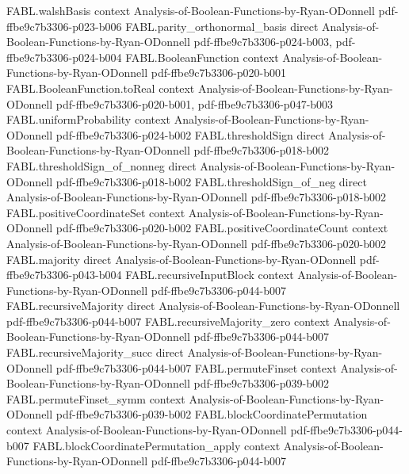 \begin{theorem}
  {FABL.walshBasis}
  {context}
  {Analysis-of-Boolean-Functions-by-Ryan-ODonnell}
  {pdf-ffbe9c7b3306-p023-b006}
\proofstep
  {FABL.parity_orthonormal_basis}
  {direct}
  {Analysis-of-Boolean-Functions-by-Ryan-ODonnell}
  {pdf-ffbe9c7b3306-p024-b003,
    pdf-ffbe9c7b3306-p024-b004}
\proofstep
  {FABL.BooleanFunction}
  {context}
  {Analysis-of-Boolean-Functions-by-Ryan-ODonnell}
  {pdf-ffbe9c7b3306-p020-b001}
\proofstep
  {FABL.BooleanFunction.toReal}
  {context}
  {Analysis-of-Boolean-Functions-by-Ryan-ODonnell}
  {pdf-ffbe9c7b3306-p020-b001,
    pdf-ffbe9c7b3306-p047-b003}
\proofstep
  {FABL.uniformProbability}
  {context}
  {Analysis-of-Boolean-Functions-by-Ryan-ODonnell}
  {pdf-ffbe9c7b3306-p024-b002}
\proofstep
  {FABL.thresholdSign}
  {direct}
  {Analysis-of-Boolean-Functions-by-Ryan-ODonnell}
  {pdf-ffbe9c7b3306-p018-b002}
\proofstep
  {FABL.thresholdSign_of_nonneg}
  {direct}
  {Analysis-of-Boolean-Functions-by-Ryan-ODonnell}
  {pdf-ffbe9c7b3306-p018-b002}
\proofstep
  {FABL.thresholdSign_of_neg}
  {direct}
  {Analysis-of-Boolean-Functions-by-Ryan-ODonnell}
  {pdf-ffbe9c7b3306-p018-b002}
\proofstep
  {FABL.positiveCoordinateSet}
  {context}
  {Analysis-of-Boolean-Functions-by-Ryan-ODonnell}
  {pdf-ffbe9c7b3306-p020-b002}
\proofstep
  {FABL.positiveCoordinateCount}
  {context}
  {Analysis-of-Boolean-Functions-by-Ryan-ODonnell}
  {pdf-ffbe9c7b3306-p020-b002}
\proofstep
  {FABL.majority}
  {direct}
  {Analysis-of-Boolean-Functions-by-Ryan-ODonnell}
  {pdf-ffbe9c7b3306-p043-b004}
\proofstep
  {FABL.recursiveInputBlock}
  {context}
  {Analysis-of-Boolean-Functions-by-Ryan-ODonnell}
  {pdf-ffbe9c7b3306-p044-b007}
\proofstep
  {FABL.recursiveMajority}
  {direct}
  {Analysis-of-Boolean-Functions-by-Ryan-ODonnell}
  {pdf-ffbe9c7b3306-p044-b007}
\proofstep
  {FABL.recursiveMajority_zero}
  {context}
  {Analysis-of-Boolean-Functions-by-Ryan-ODonnell}
  {pdf-ffbe9c7b3306-p044-b007}
\proofstep
  {FABL.recursiveMajority_succ}
  {direct}
  {Analysis-of-Boolean-Functions-by-Ryan-ODonnell}
  {pdf-ffbe9c7b3306-p044-b007}
\proofstep
  {FABL.permuteFinset}
  {context}
  {Analysis-of-Boolean-Functions-by-Ryan-ODonnell}
  {pdf-ffbe9c7b3306-p039-b002}
\proofstep
  {FABL.permuteFinset_symm}
  {context}
  {Analysis-of-Boolean-Functions-by-Ryan-ODonnell}
  {pdf-ffbe9c7b3306-p039-b002}
\proofstep
  {FABL.blockCoordinatePermutation}
  {context}
  {Analysis-of-Boolean-Functions-by-Ryan-ODonnell}
  {pdf-ffbe9c7b3306-p044-b007}
\proofstep
  {FABL.blockCoordinatePermutation_apply}
  {context}
  {Analysis-of-Boolean-Functions-by-Ryan-ODonnell}
  {pdf-ffbe9c7b3306-p044-b007}
\proofstep

\end{theorem}
